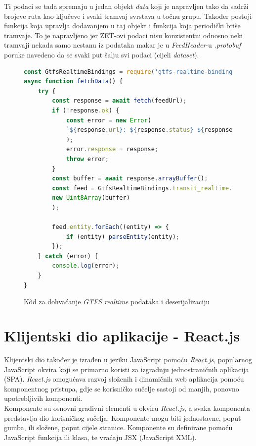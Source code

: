\documentclass[zavrsnirad]{fer}
\begin{document}
Ti podaci se tada spremaju u jedan objekt \textit{data} koji je napravljen tako da sadrži brojeve ruta kao ključeve i svaki tramvaj svrstava u točnu grupu. Također postoji funkcija koja upravlja dodavanjem u taj objekt i funkcija koja periodički briše tramvaje. To je napravljeno jer ZET-ovi podaci nisu konzistentni odnosno neki tramvaji nekada samo nestanu iz podataka makar je u \textit{FeedHeader}-u \textit{.protobuf} poruke navedeno da se svaki put šalju svi podaci (cijeli \textit{dataset}).

\begin{figure}[H]
	\centering
	\begin{minipage}{0.9\linewidth}
		\begin{lstlisting}[language=JavaScript]
const GtfsRealtimeBindings = require('gtfs-realtime-bindings');
async function fetchData() {
	try {
		const response = await fetch(feedUrl);
		if (!response.ok) {
			const error = new Error(
			`${response.url}: ${response.status} ${response.statusText}`
			);
			error.response = response;
			throw error;
		}
		const buffer = await response.arrayBuffer();
		const feed = GtfsRealtimeBindings.transit_realtime.FeedMessage.decode(
		new Uint8Array(buffer)
		);
		
		feed.entity.forEach((entity) => {
			if (entity) parseEntity(entity);
		});
	} catch (error) {
		console.log(error);
	}
}
		\end{lstlisting}
	\end{minipage}
	\caption{K\^od za dohvaćanje \textit{GTFS realtime} podataka i deserijalizaciju}
	\label{slk:dohvatGTFS}
\end{figure}
\newpage

\section{Klijentski dio aplikacije - React.js}
\label{sec:frontend}

Klijentski dio također je izrađen u jeziku JavaScript pomoću \textit{React.js}, popularnog JavaScript okvira koji se primarno koristi za izgradnju jednostraničnih aplikacija (SPA). \textit{React.js} omogućava razvoj složenih i dinamičnih web aplikacija pomoću komponentnog pristupa, gdje se korisničko sučelje sastoji od manjih, ponovno upotrebljivih komponenti.\\
Komponente su osnovni gradivni elementi u okviru \textit{React.js}, a svaka komponenta predstavlja dio korisničkog sučelja. Komponente mogu biti jednostavne, poput gumba, ili složene, poput cijele stranice. Komponente su definirane pomoću JavaScript funkcija ili klasa, te vraćaju JSX (JavaScript XML).\\
\end{document}
